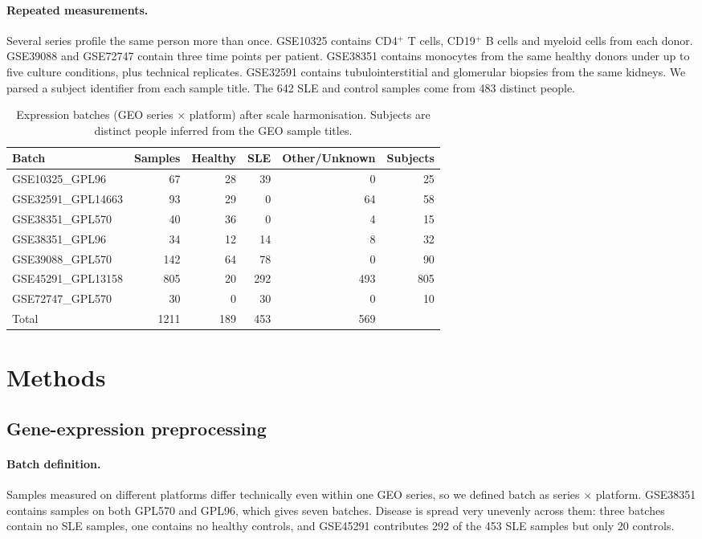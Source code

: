 \documentclass[11pt]{article}
\begin{document}
\paragraph{Repeated measurements.} Several series profile the same person more than once. GSE10325 contains CD4$^+$ T cells, CD19$^+$ B cells and myeloid cells from each donor. GSE39088 and GSE72747 contain three time points per patient. GSE38351 contains monocytes from the same healthy donors under up to five culture conditions, plus technical replicates. GSE32591 contains tubulointerstitial and glomerular biopsies from the same kidneys. We parsed a subject identifier from each sample title. The 642 SLE and control samples come from 483 distinct people.

\begin{table}[t]
\centering
\caption{Expression batches (GEO series $\times$ platform) after scale harmonisation. Subjects are distinct people inferred from the GEO sample titles.}
\label{tab:batches}
\small
\begin{tabular}{lrrrrr}
\toprule
Batch & Samples & Healthy & SLE & Other/Unknown & Subjects \\
\midrule
GSE10325\_GPL96     & 67  & 28 & 39  & 0   & 25 \\
GSE32591\_GPL14663  & 93  & 29 & 0   & 64  & 58 \\
GSE38351\_GPL570    & 40  & 36 & 0   & 4   & 15 \\
GSE38351\_GPL96     & 34  & 12 & 14  & 8   & 32 \\
GSE39088\_GPL570    & 142 & 64 & 78  & 0   & 90 \\
GSE45291\_GPL13158  & 805 & 20 & 292 & 493 & 805 \\
GSE72747\_GPL570    & 30  & 0  & 30  & 0   & 10 \\
\midrule
Total               & 1211 & 189 & 453 & 569 & \\
\bottomrule
\end{tabular}
\end{table}

\section{Methods}

\subsection{Gene-expression preprocessing}

\paragraph{Batch definition.} Samples measured on different platforms differ technically even within one GEO series, so we defined batch as series $\times$ platform. GSE38351 contains samples on both GPL570 and GPL96, which gives seven batches. Disease is spread very unevenly across them: three batches contain no SLE samples, one contains no healthy controls, and GSE45291 contributes 292 of the 453 SLE samples but only 20 controls.
\end{document}

